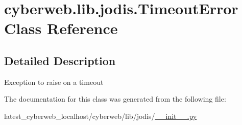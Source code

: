 \hypertarget{classcyberweb_1_1lib_1_1jodis_1_1_timeout_error}{\section{cyberweb.\-lib.\-jodis.\-Timeout\-Error \-Class \-Reference}
\label{classcyberweb_1_1lib_1_1jodis_1_1_timeout_error}
}


\subsection{\-Detailed \-Description}
\begin{DoxyVerb}
Exception to raise on a timeout
\end{DoxyVerb}
 

\-The documentation for this class was generated from the following file\-:\begin{DoxyCompactItemize}
\item 
latest\-\_\-cyberweb\-\_\-localhost/cyberweb/lib/jodis/\hyperlink{lib_2jodis_2____init_____8py}{\-\_\-\-\_\-init\-\_\-\-\_\-.\-py}\end{DoxyCompactItemize}
